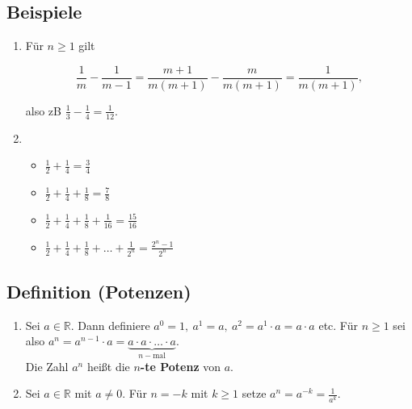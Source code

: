 \subsection{Beispiele}

	 \begin{enumerate}
	 
		 \item Für $n\geq 1$ gilt
	
		 \[
		 	\frac{1}{m}-\frac{1}{m-1}=\frac{m+1}{m(m+1)}-\frac{m}{m(m+1)}=\frac{1}{m(m+1)},
		 \]
	  
	  also zB $\frac{1}{3}-\frac{1}{4}=\frac{1}{12}$.\\
	  \newline
	  
	  	\item
	  	\begin{itemize}

	  		\item $\frac{1}{2}+\frac{1}{4}=\frac{3}{4}$
	  		\item $\frac{1}{2}+\frac{1}{4}+\frac{1}{8}=\frac{7}{8}$
	  		\item $\frac{1}{2}+\frac{1}{4}+\frac{1}{8}+\frac{1}{16}=\frac{15}{16}$
	  		\item $\frac{1}{2}+\frac{1}{4}+\frac{1}{8}+\dots+\frac{1}{2^n}=\frac{2^n-1}{2^n}$
	  		
	  	\end{itemize}
	 
	 \end{enumerate}
	 
	 
\subsection[Potenzen]{Definition (Potenzen)}

	\begin{enumerate}

		\item Sei $a\in\mathbb{R}$. Dann definiere $a^0=1,\ a^1=a,\ 
		a^2=a^1\cdot a=a\cdot a$ etc.
		\newline
		Für $n\geq 1$ sei also $a^n=a^{n-1}\cdot a=
		\underbrace{a\cdot a\cdot\ldots\cdot a}_{n-\text{mal}}$.\\
		Die Zahl $a^n$ heißt die \textbf{$n$-te Potenz} von $a$.
	
		\item Sei $a\in\mathbb{R}$ mit $a\neq 0$. Für $n=-k$ mit $k\geq 1$ setze
		$a^n=a^{-k}=\frac{1}{a^k}$.\\
	
	\end{enumerate}


